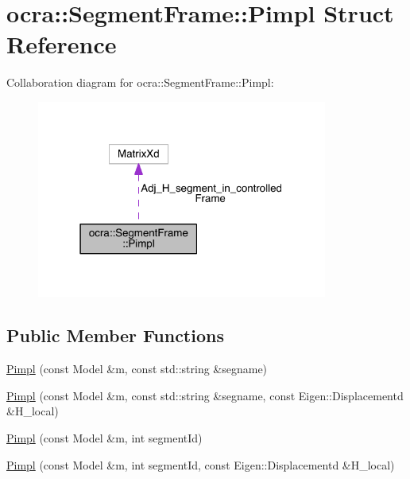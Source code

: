 \hypertarget{structocra_1_1SegmentFrame_1_1Pimpl}{}\section{ocra\+:\+:Segment\+Frame\+:\+:Pimpl Struct Reference}
\label{structocra_1_1SegmentFrame_1_1Pimpl}


Collaboration diagram for ocra\+:\+:Segment\+Frame\+:\+:Pimpl\+:\nopagebreak
\begin{figure}[H]
\begin{center}
\leavevmode
\includegraphics[width=271pt]{dc/d06/structocra_1_1SegmentFrame_1_1Pimpl__coll__graph}
\end{center}
\end{figure}
\subsection*{Public Member Functions}
\begin{DoxyCompactItemize}
\item 
\hyperlink{structocra_1_1SegmentFrame_1_1Pimpl_a3e4a372b7ffde0baf617f8097a4d9285}{Pimpl} (const Model \&m, const std\+::string \&segname)
\item 
\hyperlink{structocra_1_1SegmentFrame_1_1Pimpl_a419d287d9da1582ff94dd9c3ab539f2b}{Pimpl} (const Model \&m, const std\+::string \&segname, const Eigen\+::\+Displacementd \&H\+\_\+local)
\item 
\hyperlink{structocra_1_1SegmentFrame_1_1Pimpl_a0de56572f8a4d14450c37bd71e432f2e}{Pimpl} (const Model \&m, int segment\+Id)
\item 
\hyperlink{structocra_1_1SegmentFrame_1_1Pimpl_a6bc146a3436c88655f79afd8bf7a46b3}{Pimpl} (const Model \&m, int segment\+Id, const Eigen\+::\+Displacementd \&H\+\_\+local)
\end{DoxyCompactItemize}
